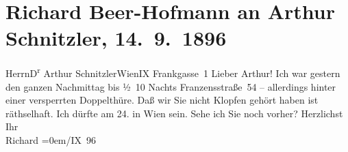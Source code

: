

         \renewcommand{\erwaehnteOrte}{Orte: Baden bei Wien, Frankgasse 1, IX., Alsergrund, Kaiser-Franz-Ring, Wien}
         \renewcommand{\erwaehnteWerke}{}
               \section[Richard Beer-Hofmann an Arthur Schnitzler, 14. 9. 1896]{ Richard Beer-Hofmann an Arthur Schnitzler, 14. 9. 1896}\nopagebreak{}\rehead{ }\begin{ledgroupsized}[t]{13cm}\normalsize\beginnumbering \toendnotes[C]{\smallbreak\pagebreak[2]} 
\pstart{}{\pb}Herrn\pend{}\pstart{}D\textsuperscript{r} Arthur Schnitzler\pend{}\pstart{}Wien\pend{}\pstart{}IX Frankgasse 1\pend{}{\bigskip}\pstart
           \noindent{}{\pb}Lieber Arthur! Ich war gestern den ganzen Nachmittag
               bis ½ 10 Nachts{ }Franzensstraße 54 – allerdings hinter einer
               versperrten Doppelthüre. Daß wir Sie nicht Klopfen gehört haben ist räthselhaft. Ich
               dürfte am 24. in Wien sein. Sehe ich
               Sie noch vorher?\pend
           \pstart
           Herzlichst{\\[\baselineskip]}Ihr{\\[\baselineskip]}\spacefill\mbox{Richard}\pend
           \leftskip=0em{}/IX 96\pend
           
         
         \endnumbering{}\end{ledgroupsized}  \newcommand{\dateiname}{L00589}\newcommand{\titel}{Richard Beer-Hofmann an Arthur Schnitzler, 14. 9. 1896}\newcommand{\editorInnen}{Martin Anton Müller und Gerd-Hermann Susen}
      